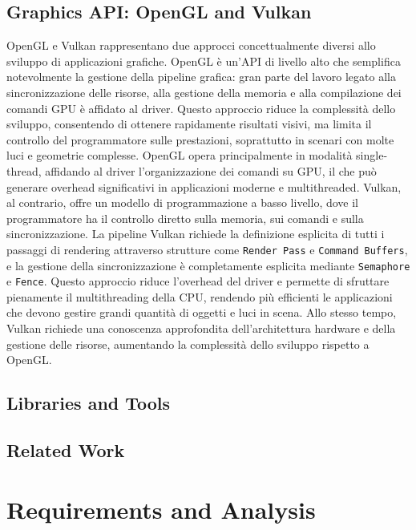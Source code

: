 \documentclass[12pt,a4paper,openright,twoside]{book}
\begin{document}
\section{Graphics API: OpenGL and Vulkan}
OpenGL e Vulkan rappresentano due approcci concettualmente diversi allo sviluppo di applicazioni grafiche.
OpenGL è un'API di livello alto che semplifica notevolmente la gestione della pipeline grafica: gran parte del lavoro
legato alla sincronizzazione delle risorse, alla gestione della memoria e alla compilazione dei comandi GPU è affidato
al driver. Questo approccio riduce la complessità dello sviluppo, consentendo di ottenere rapidamente risultati visivi,
ma limita il controllo del programmatore sulle prestazioni, soprattutto in scenari con molte luci e geometrie complesse.
OpenGL opera principalmente in modalità single-thread, affidando al driver l’organizzazione dei comandi su GPU, il che può
generare overhead significativi in applicazioni moderne e multithreaded.
Vulkan, al contrario, offre un modello di programmazione a basso livello, dove il programmatore ha il controllo diretto
sulla memoria, sui comandi e sulla sincronizzazione. La pipeline Vulkan richiede la definizione esplicita di tutti i
passaggi di rendering attraverso strutture come \texttt{Render Pass} e \texttt{Command Buffers}, e la gestione della 
sincronizzazione è completamente esplicita mediante \texttt{Semaphore} e \texttt{Fence}. Questo approccio riduce
l’overhead del driver e permette di sfruttare pienamente il multithreading della CPU, rendendo più efficienti
le applicazioni che devono gestire grandi quantità di oggetti e luci in scena. Allo stesso tempo, Vulkan richiede
una conoscenza approfondita dell’architettura hardware e della gestione delle risorse, aumentando la complessità
dello sviluppo rispetto a OpenGL.

\section{Libraries and Tools}

\section{Related Work}

\chapter{Requirements and Analysis}
\label{chap:analysis}
\end{document}
